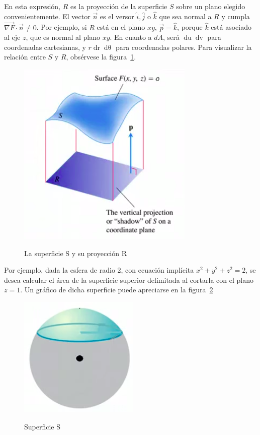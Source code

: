 \documentclass{article}
\begin{document}
En esta expresión, $R$ es la proyección de la superficie $S$ sobre un plano elegido convenientemente. El vector $\overrightarrow{n}$ es el versor $\hat{i}, \hat{j}$ o $\hat{k}$ que sea normal a $R$ y cumpla $\overrightarrow{ \nabla F } \cdot \overrightarrow{n} \neq 0$. Por ejemplo, si $R$ está en el plano $xy$, $\overrightarrow{p} = \hat{k}$, porque $\hat{k}$ está asociado al eje $z$, que es normal al plano $xy$. En cuanto a $dA$, será $\mathop{du} \mathop{dv}$ para coordenadas cartesianas, y $r \mathop{dr} \mathop{d\theta}$ para coordenadas polares. Para visualizar la relación entre $S$ y $R$, obsérvese la figura~\ref{fig:isi}.

\begin{figure}[ht]
\centering
\caption{La superficie S y su proyección R}
\includegraphics[scale=0.8]{img/teo_fig027_isi.png}
\label{fig:isi}
\end{figure}

Por ejemplo, dada la esfera de radio 2, con ecuación implícita $x^2 + y^2 + z^2 = 2$, se desea calcular el área de la superficie superior delimitada al cortarla con el plano $z = 1$. Un gráfico de dicha superficie puede apreciarse en la figura~\ref{fig:isiej}

\begin{figure}[ht]
\centering
\caption{Superficie S}
\includegraphics[scale=0.8]{img/teo_fig028_isi.png}
\label{fig:isiej}
\end{figure}
\end{document}
